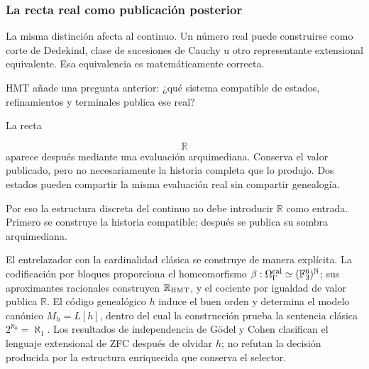 \subsubsection{La recta real como publicación posterior}
La misma distinción afecta al continuo. Un número real puede construirse como corte de Dedekind, clase de sucesiones de Cauchy u otro representante extensional equivalente. Esa equivalencia es matemáticamente correcta.\par
HMT añade una pregunta anterior: ¿qué sistema compatible de estados, refinamientos y terminales publica ese real?\par
La recta\par
\[
\mathbb R
\]
aparece después mediante una evaluación arquimediana. Conserva el valor publicado, pero no necesariamente la historia completa que lo produjo. Dos estados pueden compartir la misma evaluación real sin compartir genealogía.\par
Por eso la estructura discreta del continuo no debe introducir \(\mathbb R\) como entrada. Primero se construye la historia compatible; después se publica su sombra arquimediana.\par
El entrelazador con la cardinalidad clásica se construye de manera explícita.
La codificación por bloques proporciona el homeomorfismo
\(\beta:\Omega_\Gamma^{\rm cal}\simeq(\mathbb F_3^6)^{\mathbb N}\); sus
aproximantes racionales construyen \(\mathbb R_{\rm HMT}\), y el cociente por
igualdad de valor publica \(\mathbb R\). El código genealógico \(h\) induce
el buen orden y determina el modelo canónico \(M_h=L[h]\), dentro del cual
la construcción prueba la sentencia clásica
\(2^{\aleph_0}=\aleph_1\). Los resultados de independencia de Gödel y Cohen
clasifican el lenguaje extensional de ZFC después de olvidar \(h\); no
refutan la decisión producida por la estructura enriquecida que conserva el
selector.\par
{}
